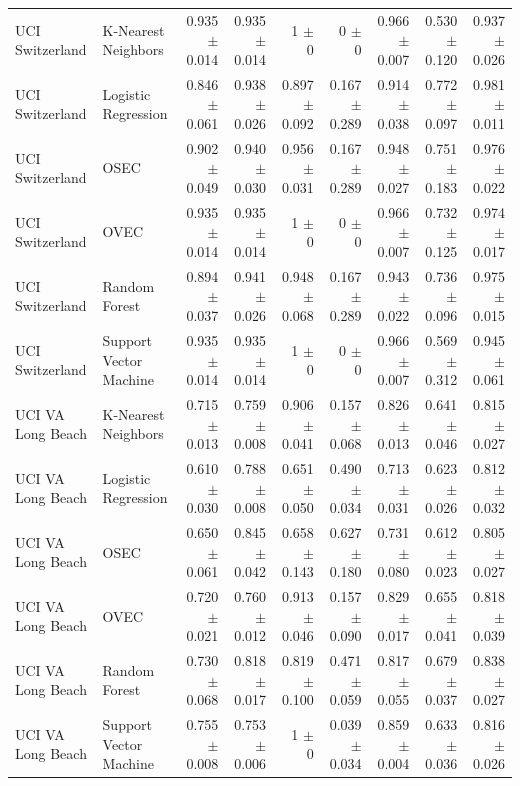 \begin{tabular}{llrrrrrrr}
UCI Switzerland & K-Nearest Neighbors & 0.935 $\pm$ 0.014 & 0.935 $\pm$ 0.014 & 1 $\pm$ 0 & 0 $\pm$ 0 & 0.966 $\pm$ 0.007 & 0.530 $\pm$ 0.120 & 0.937 $\pm$ 0.026 \\
UCI Switzerland & Logistic Regression & 0.846 $\pm$ 0.061 & 0.938 $\pm$ 0.026 & 0.897 $\pm$ 0.092 & 0.167 $\pm$ 0.289 & 0.914 $\pm$ 0.038 & 0.772 $\pm$ 0.097 & 0.981 $\pm$ 0.011 \\
UCI Switzerland & OSEC & 0.902 $\pm$ 0.049 & 0.940 $\pm$ 0.030 & 0.956 $\pm$ 0.031 & 0.167 $\pm$ 0.289 & 0.948 $\pm$ 0.027 & 0.751 $\pm$ 0.183 & 0.976 $\pm$ 0.022 \\
UCI Switzerland & OVEC & 0.935 $\pm$ 0.014 & 0.935 $\pm$ 0.014 & 1 $\pm$ 0 & 0 $\pm$ 0 & 0.966 $\pm$ 0.007 & 0.732 $\pm$ 0.125 & 0.974 $\pm$ 0.017 \\
UCI Switzerland & Random Forest & 0.894 $\pm$ 0.037 & 0.941 $\pm$ 0.026 & 0.948 $\pm$ 0.068 & 0.167 $\pm$ 0.289 & 0.943 $\pm$ 0.022 & 0.736 $\pm$ 0.096 & 0.975 $\pm$ 0.015 \\
UCI Switzerland & Support Vector Machine & 0.935 $\pm$ 0.014 & 0.935 $\pm$ 0.014 & 1 $\pm$ 0 & 0 $\pm$ 0 & 0.966 $\pm$ 0.007 & 0.569 $\pm$ 0.312 & 0.945 $\pm$ 0.061 \\
UCI VA Long Beach & K-Nearest Neighbors & 0.715 $\pm$ 0.013 & 0.759 $\pm$ 0.008 & 0.906 $\pm$ 0.041 & 0.157 $\pm$ 0.068 & 0.826 $\pm$ 0.013 & 0.641 $\pm$ 0.046 & 0.815 $\pm$ 0.027 \\
UCI VA Long Beach & Logistic Regression & 0.610 $\pm$ 0.030 & 0.788 $\pm$ 0.008 & 0.651 $\pm$ 0.050 & 0.490 $\pm$ 0.034 & 0.713 $\pm$ 0.031 & 0.623 $\pm$ 0.026 & 0.812 $\pm$ 0.032 \\
UCI VA Long Beach & OSEC & 0.650 $\pm$ 0.061 & 0.845 $\pm$ 0.042 & 0.658 $\pm$ 0.143 & 0.627 $\pm$ 0.180 & 0.731 $\pm$ 0.080 & 0.612 $\pm$ 0.023 & 0.805 $\pm$ 0.027 \\
UCI VA Long Beach & OVEC & 0.720 $\pm$ 0.021 & 0.760 $\pm$ 0.012 & 0.913 $\pm$ 0.046 & 0.157 $\pm$ 0.090 & 0.829 $\pm$ 0.017 & 0.655 $\pm$ 0.041 & 0.818 $\pm$ 0.039 \\
UCI VA Long Beach & Random Forest & 0.730 $\pm$ 0.068 & 0.818 $\pm$ 0.017 & 0.819 $\pm$ 0.100 & 0.471 $\pm$ 0.059 & 0.817 $\pm$ 0.055 & 0.679 $\pm$ 0.037 & 0.838 $\pm$ 0.027 \\
UCI VA Long Beach & Support Vector Machine & 0.755 $\pm$ 0.008 & 0.753 $\pm$ 0.006 & 1 $\pm$ 0 & 0.039 $\pm$ 0.034 & 0.859 $\pm$ 0.004 & 0.633 $\pm$ 0.036 & 0.816 $\pm$ 0.026 \\
\bottomrule
\end{tabular}
